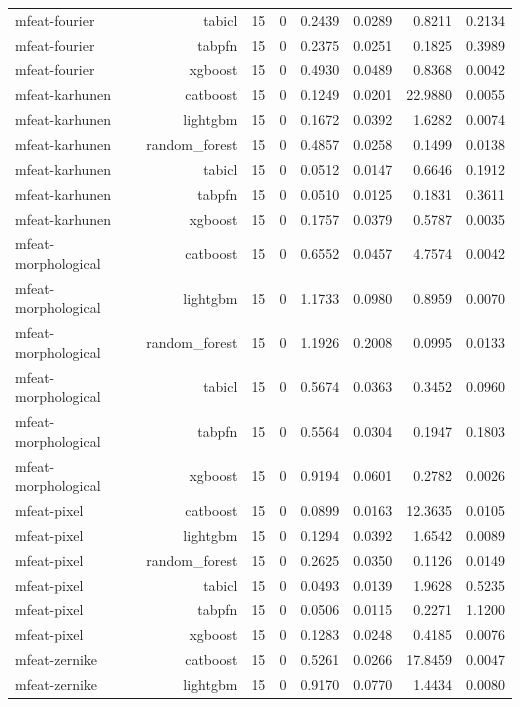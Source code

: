 \begin{table}[htbp]
\begin{tabular}{lrrrrrrr}
mfeat-fourier & tabicl & 15 & 0 & 0.2439 & 0.0289 & 0.8211 & 0.2134 \\
mfeat-fourier & tabpfn & 15 & 0 & 0.2375 & 0.0251 & 0.1825 & 0.3989 \\
mfeat-fourier & xgboost & 15 & 0 & 0.4930 & 0.0489 & 0.8368 & 0.0042 \\
mfeat-karhunen & catboost & 15 & 0 & 0.1249 & 0.0201 & 22.9880 & 0.0055 \\
mfeat-karhunen & lightgbm & 15 & 0 & 0.1672 & 0.0392 & 1.6282 & 0.0074 \\
mfeat-karhunen & random\_forest & 15 & 0 & 0.4857 & 0.0258 & 0.1499 & 0.0138 \\
mfeat-karhunen & tabicl & 15 & 0 & 0.0512 & 0.0147 & 0.6646 & 0.1912 \\
mfeat-karhunen & tabpfn & 15 & 0 & 0.0510 & 0.0125 & 0.1831 & 0.3611 \\
mfeat-karhunen & xgboost & 15 & 0 & 0.1757 & 0.0379 & 0.5787 & 0.0035 \\
mfeat-morphological & catboost & 15 & 0 & 0.6552 & 0.0457 & 4.7574 & 0.0042 \\
mfeat-morphological & lightgbm & 15 & 0 & 1.1733 & 0.0980 & 0.8959 & 0.0070 \\
mfeat-morphological & random\_forest & 15 & 0 & 1.1926 & 0.2008 & 0.0995 & 0.0133 \\
mfeat-morphological & tabicl & 15 & 0 & 0.5674 & 0.0363 & 0.3452 & 0.0960 \\
mfeat-morphological & tabpfn & 15 & 0 & 0.5564 & 0.0304 & 0.1947 & 0.1803 \\
mfeat-morphological & xgboost & 15 & 0 & 0.9194 & 0.0601 & 0.2782 & 0.0026 \\
mfeat-pixel & catboost & 15 & 0 & 0.0899 & 0.0163 & 12.3635 & 0.0105 \\
mfeat-pixel & lightgbm & 15 & 0 & 0.1294 & 0.0392 & 1.6542 & 0.0089 \\
mfeat-pixel & random\_forest & 15 & 0 & 0.2625 & 0.0350 & 0.1126 & 0.0149 \\
mfeat-pixel & tabicl & 15 & 0 & 0.0493 & 0.0139 & 1.9628 & 0.5235 \\
mfeat-pixel & tabpfn & 15 & 0 & 0.0506 & 0.0115 & 0.2271 & 1.1200 \\
mfeat-pixel & xgboost & 15 & 0 & 0.1283 & 0.0248 & 0.4185 & 0.0076 \\
mfeat-zernike & catboost & 15 & 0 & 0.5261 & 0.0266 & 17.8459 & 0.0047 \\
mfeat-zernike & lightgbm & 15 & 0 & 0.9170 & 0.0770 & 1.4434 & 0.0080 \\

\end{tabular}
\end{table}
